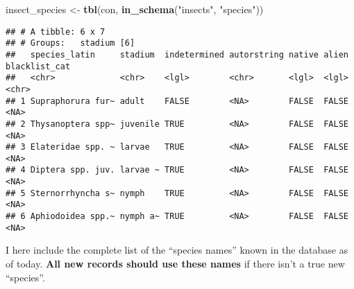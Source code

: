 \documentclass[]{article}
\newenvironment{Shaded}{\begin{snugshade}}{\end{snugshade}}
\newcommand{\DataTypeTok}[1]{\textcolor[rgb]{0.13,0.29,0.53}{#1}}
\newcommand{\DecValTok}[1]{\textcolor[rgb]{0.00,0.00,0.81}{#1}}
\newcommand{\KeywordTok}[1]{\textcolor[rgb]{0.13,0.29,0.53}{\textbf{#1}}}
\newcommand{\NormalTok}[1]{#1}
\newcommand{\OperatorTok}[1]{\textcolor[rgb]{0.81,0.36,0.00}{\textbf{#1}}}
\newcommand{\StringTok}[1]{\textcolor[rgb]{0.31,0.60,0.02}{#1}}
\begin{document}
\begin{Shaded}
\begin{Highlighting}[]
\NormalTok{insect_species <-}\StringTok{ }\KeywordTok{tbl}\NormalTok{(con, }\KeywordTok{in_schema}\NormalTok{(}\StringTok{"insects"}\NormalTok{, }\StringTok{"species"}\NormalTok{))}
\end{Highlighting}
\end{Shaded}

\begin{Shaded}
\end{Shaded}

\begin{verbatim}
## # A tibble: 6 x 7
## # Groups:   stadium [6]
##   species_latin     stadium  indetermined autorstring native alien blacklist_cat
##   <chr>             <chr>    <lgl>        <chr>       <lgl>  <lgl> <chr>        
## 1 Supraphorura fur~ adult    FALSE        <NA>        FALSE  FALSE <NA>         
## 2 Thysanoptera spp~ juvenile TRUE         <NA>        FALSE  FALSE <NA>         
## 3 Elateridae spp. ~ larvae   TRUE         <NA>        FALSE  FALSE <NA>         
## 4 Diptera spp. juv. larvae ~ TRUE         <NA>        FALSE  FALSE <NA>         
## 5 Sternorrhyncha s~ nymph    TRUE         <NA>        FALSE  FALSE <NA>         
## 6 Aphiodoidea spp.~ nymph a~ TRUE         <NA>        FALSE  FALSE <NA>
\end{verbatim}

I here include the complete list of the ``species names'' known in the
database as of today. \textbf{All new records should use these names} if
there isn't a true new ``species''.

\begin{Shaded}
\end{Shaded}
\end{document}
